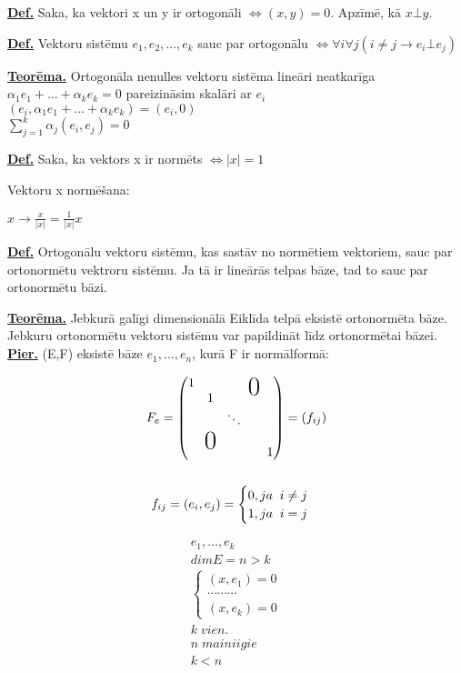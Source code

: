 \documentclass[12pt]{article}
\begin{document}

\textbf{\underline{Def.}} Saka, ka vektori x un y ir ortogonāli $\Leftrightarrow (x,y) = 0$. Apzīmē, kā $ x \bot y$.

\textbf{\underline{Def.}}  Vektoru sistēmu $e_1, e_2, \ldots, e_k$ sauc par ortogonālu   
$\Leftrightarrow  \forall i \forall j (i \neq j  \rightarrow e_i  \bot e_j)$

\textbf{\underline{Teorēma.}} Ortogonāla nenulles vektoru sistēma lineāri neatkarīga \\
$\alpha_1e_1 + \ldots + \alpha_ke_k = 0$ pareizināsim skalāri ar $e_i$ \\
$(e_i, \alpha_1e_1 + \ldots + \alpha_ke_k) = (e_i,0) $ \\
$\sum_{j=1}^{k}\alpha_j(e_i,e_j)=0$

\textbf{\underline{Def.}} Saka, ka vektors x ir normēts  $\Leftrightarrow |x| = 1 $

Vektoru x normēšana: 

$ x \rightarrow \frac{x}{|x|} = \frac{1}{|x|} x $

\textbf{\underline{Def.}} Ortogonālu vektoru sistēmu,  kas sastāv no normētiem vektoriem, sauc par ortonormētu vektroru sistēmu. Ja tā ir lineārās telpas bāze, tad to sauc par ortonormētu bāzi. 

\pagebreak 

\textbf{\underline{Teorēma.}} Jebkurā galīgi dimensionālā Eiklīda telpā eksistē ortonormēta bāze. \\
Jebkuru ortonormētu vektoru sistēmu var papildināt līdz ortonormētai bāzei. \\

\textbf{\underline{Pier.}} 
(E,F) eksistē bāze $e_1, \ldots, e_n$, kurā  F ir normālformā: 

\begin{gather*}
	F_e = 
	\begin{pmatrix}
	1 & && \bigzero   \\ 
    	& 1 &  \\
	& &  \ddots  &\\ 
        & \bigzero  &  \\
    	& &  & &  1  \\ 	
    \end{pmatrix}
    = (f_{ij}) \\ \\ 
    f_{ij} = (e_i, e_j) = 
    \begin{cases}
	0, ja \; \;  i \neq j \\
	1, ja \; \; i = j 
     \end{cases}
\end{gather*}


\begin{gather*}
	e_1, \ldots, e_k \\
	dim E = n > k \\
	\begin{cases}
		(x, e_1) = 0 \\ 
		\cdots \cdots \cdots \\ 
 		(x, e_k) = 0
	\end{cases} \\
	k \; vien. \\
	n \; mainiigie \\
	k < n
\end{gather*}
\end{document}
